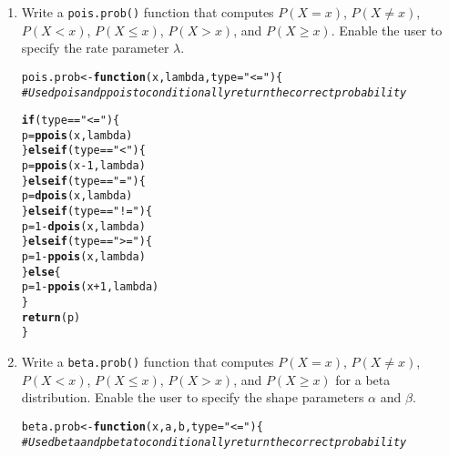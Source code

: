 \documentclass{article}\usepackage[]{graphicx}\usepackage[]{xcolor}
\makeatletter
\newcommand{\hlnum}[1]{\textcolor[rgb]{0.686,0.059,0.569}{#1}}%
\newcommand{\hlsng}[1]{\textcolor[rgb]{0.192,0.494,0.8}{#1}}%
\newcommand{\hlcom}[1]{\textcolor[rgb]{0.678,0.584,0.686}{\textit{#1}}}%
\newcommand{\hlopt}[1]{\textcolor[rgb]{0,0,0}{#1}}%
\newcommand{\hldef}[1]{\textcolor[rgb]{0.345,0.345,0.345}{#1}}%
\newcommand{\hlkwa}[1]{\textcolor[rgb]{0.161,0.373,0.58}{\textbf{#1}}}%
\newcommand{\hlkwb}[1]{\textcolor[rgb]{0.69,0.353,0.396}{#1}}%
\newcommand{\hlkwc}[1]{\textcolor[rgb]{0.333,0.667,0.333}{#1}}%
\newcommand{\hlkwd}[1]{\textcolor[rgb]{0.737,0.353,0.396}{\textbf{#1}}}%
\newenvironment{kframe}{%
 \def\at@end@of@kframe{}%
 \ifinner\ifhmode%
  \def\at@end@of@kframe{\end{minipage}}%
  \begin{minipage}{\columnwidth}%
 \fi\fi%
 \def\FrameCommand##1{\hskip\@totalleftmargin \hskip-\fboxsep
 \colorbox{shadecolor}{##1}\hskip-\fboxsep
     \hskip-\linewidth \hskip-\@totalleftmargin \hskip\columnwidth}%
 \MakeFramed {\advance\hsize-\width
   \@totalleftmargin\z@ \linewidth\hsize
   \@setminipage}}%
 {\par\unskip\endMakeFramed%
 \at@end@of@kframe}
\newenvironment{knitrout}{}{} %
\makeatother
\begin{document}
  \begin{enumerate}
    \item Write a \texttt{pois.prob()} function that computes $P(X=x)$, 
    $P(X \neq x)$, $P(X<x)$, $P(X \leq x)$, $P(X > x)$, and $P(X \geq x).$ Enable the user to specify the rate parameter $\lambda$.
\begin{knitrout}\scriptsize
{}\color{fgcolor}\begin{kframe}
\begin{alltt}
\hldef{pois.prob} \hlkwb{<-} \hlkwa{function}\hldef{(}\hlkwc{x}\hldef{,} \hlkwc{lambda}\hldef{,} \hlkwc{type}\hldef{=}\hlsng{"<="}\hldef{)\{}
  \hlcom{# Use dpois and ppois to conditionally return the correct probability}

  \hlkwa{if} \hldef{(type} \hlopt{==} \hlsng{"<="}\hldef{) \{}
    \hldef{p} \hlkwb{=} \hlkwd{ppois}\hldef{(x, lambda)}
  \hldef{\}}\hlkwa{else if} \hldef{(type} \hlopt{==} \hlsng{"<"}\hldef{) \{}
    \hldef{p} \hlkwb{=} \hlkwd{ppois}\hldef{(x}\hlopt{-}\hlnum{1}\hldef{, lambda)}
  \hldef{\}}\hlkwa{else if} \hldef{(type} \hlopt{==} \hlsng{"="}\hldef{) \{}
    \hldef{p} \hlkwb{=} \hlkwd{dpois}\hldef{(x, lambda)}
  \hldef{\}}\hlkwa{else if} \hldef{(type} \hlopt{==} \hlsng{"!="}\hldef{) \{}
    \hldef{p} \hlkwb{=} \hlnum{1} \hlopt{-} \hlkwd{dpois}\hldef{(x, lambda)}
  \hldef{\}}\hlkwa{else if} \hldef{(type} \hlopt{==} \hlsng{">="}\hldef{) \{}
    \hldef{p} \hlkwb{=} \hlnum{1} \hlopt{-} \hlkwd{ppois}\hldef{(x, lambda)}
  \hldef{\}}\hlkwa{else} \hldef{\{}
    \hldef{p} \hlkwb{=} \hlnum{1} \hlopt{-} \hlkwd{ppois}\hldef{(x}\hlopt{+}\hlnum{1}\hldef{, lambda)}
  \hldef{\}}
  \hlkwd{return}\hldef{(p)}
\hldef{\}}
\end{alltt}
\end{kframe}
\end{knitrout}
    \item Write a \texttt{beta.prob()} function that computes $P(X=x)$, 
    $P(X \neq x)$, $P(X<x)$, $P(X \leq x)$, $P(X > x)$, and $P(X \geq x)$
    for a beta distribution. Enable the user to specify the shape parameters
    $\alpha$ and $\beta$.
\begin{knitrout}\scriptsize
{}\color{fgcolor}\begin{kframe}
\begin{alltt}
\hldef{beta.prob} \hlkwb{<-} \hlkwa{function}\hldef{(}\hlkwc{x}\hldef{,} \hlkwc{a}\hldef{,} \hlkwc{b}\hldef{,} \hlkwc{type}\hldef{=}\hlsng{"<="}\hldef{)\{}
  \hlcom{# Use dbeta and pbeta to conditionally return the correct probability}


\end{alltt}
\end{kframe}
\end{knitrout}
\end{enumerate}
\end{document}
